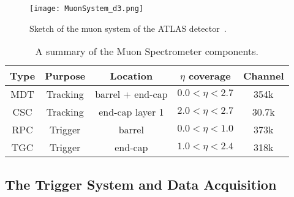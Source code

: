 \begin{figure}[htbp]
\begin{center}
\texttt{[image: MuonSystem\_d3.png]}
\caption{Sketch of the muon system of the ATLAS detector~\cite{1748-0221-3-08-S08003}.}
\label{fig:ae_muon_spectrometer}
\end{center}
\end{figure}

\begin{table}[htbp]
\begin{center}
\begin{tabular}{ccccc}
\hline
\hline
Type & Purpose & Location & $\eta$ coverage & Channel\\
\hline
MDT & Tracking & barrel + end-cap & $0.0 < \eta < 2.7$ & 354k\\
CSC & Tracking & end-cap layer 1 & $2.0 < \eta < 2.7$ & 30.7k\\
RPC & Trigger & barrel & $0.0 < \eta < 1.0$ & 373k\\
TGC & Trigger & end-cap & $1.0 < \eta < 2.4$ & 318k\\
\hline
\hline
\end{tabular}
\end{center}
\caption{A summary of the Muon Spectrometer components.}
\label{tab:ae_muon_spectrometer_components}
\end{table}%


\subsection{The Trigger System and Data Acquisition}
\label{subsec:trigger}


